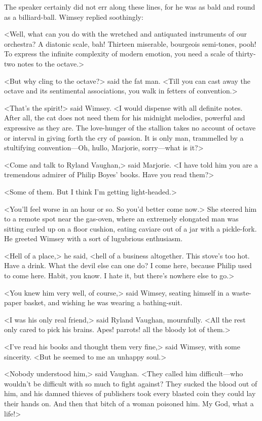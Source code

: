 The speaker certainly did not err along these lines, for he was as bald and round as a billiard-ball. Wimsey replied soothingly:

<Well, what can you do with the wretched and antiquated instruments of our orchestra? A diatonic scale, bah! Thirteen miserable, bourgeois semi-tones, pooh! To express the infinite complexity of modern emotion, you need a scale of thirty-two notes to the octave.>

<But why cling to the octave?> said the fat man. <Till you can cast away the octave and its sentimental associations, you walk in fetters of convention.>

<That's the spirit!> said Wimsey. <I would dispense with all definite notes. After all, the cat does not need them for his midnight melodies, powerful and expressive as they are. The love-hunger of the stallion takes no account of octave or interval in giving forth the cry of passion. It is only man, trammelled by a stultifying convention—Oh, hullo, Marjorie, sorry—what is it?>

<Come and talk to Ryland Vaughan,> said Marjorie. <I have told him you are a tremendous admirer of Philip Boyes' books. Have you read them?>

<Some of them. But I think I'm getting light-headed.>

<You'll feel worse in an hour or so. So you'd better come now.> She steered him to a remote spot near the gas-oven, where an extremely elongated man was sitting curled up on a floor cushion, eating caviare out of a jar with a pickle-fork. He greeted Wimsey with a sort of lugubrious enthusiasm.

<Hell of a place,> he said, <hell of a business altogether. This stove's too hot. Have a drink. What the devil else can one do? I come here, because Philip used to come here. Habit, you know. I hate it, but there's nowhere else to go.>

<You knew him very well, of course,> said Wimsey, seating himself in a waste-paper basket, and wishing he was wearing a bathing-suit.

<I was his only real friend,> said Ryland Vaughan, mournfully. <All the rest only cared to pick his brains. Apes! parrots! all the bloody lot of them.>

<I've read his books and thought them very fine,> said Wimsey, with some sincerity. <But he seemed to me an unhappy soul.>

<Nobody understood him,> said Vaughan. <They called him difficult—who wouldn't be difficult with so much to fight against? They sucked the blood out of him, and his damned thieves of publishers took every blasted coin they could lay their hands on. And then that bitch of a woman poisoned him. My God, what a life!>


